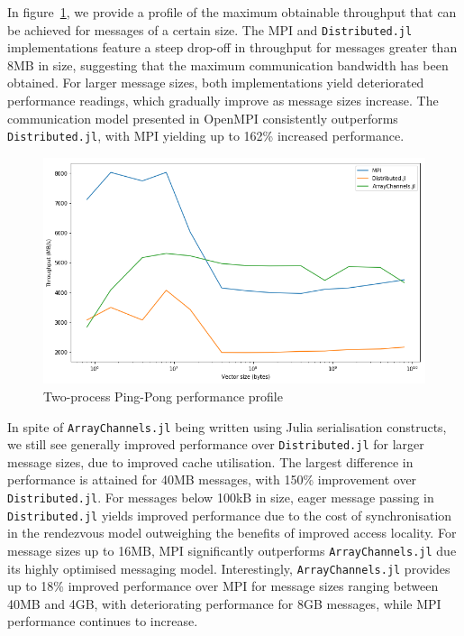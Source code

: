 \documentclass{juliacon}
\begin{document}
In figure~\ref{fig:plot-pingpong}, we provide a profile of the
maximum obtainable throughput that can be achieved for messages of a
certain size. The MPI and \texttt{Distributed.jl} implementations
feature a steep drop-off in throughput for messages greater than 8MB in
size, suggesting that the maximum communication bandwidth has been
obtained. For larger message sizes, both implementations yield
deteriorated performance readings, which gradually improve as message
sizes increase. The communication model presented in OpenMPI
consistently outperforms \texttt{Distributed.jl}, with MPI yielding up
to 162\% increased performance.

\begin{figure}[htb]
	\includegraphics[width=\linewidth]{figs/pingpong.png}
	\caption{Two-process Ping-Pong performance profile}
	\label{fig:plot-pingpong}
\end{figure}

In spite of \texttt{ArrayChannels.jl} being written using Julia
serialisation constructs, we still see generally improved performance
over \texttt{Distributed.jl} for larger message sizes, due to improved
cache utilisation. The largest difference in performance is attained for
40MB messages, with 150\% improvement over \texttt{Distributed.jl}. For
messages below 100kB in size, eager message passing in
\texttt{Distributed.jl} yields improved performance due to the cost of
synchronisation in the rendezvous model outweighing the benefits of
improved access locality. For message sizes up to 16MB, MPI
significantly outperforms \texttt{ArrayChannels.jl} due its highly
optimised messaging model. Interestingly, \texttt{ArrayChannels.jl}
provides up to 18\% improved performance over MPI for message sizes
ranging between 40MB and 4GB, with deteriorating performance for 8GB
messages, while MPI performance continues to increase.
\end{document}
